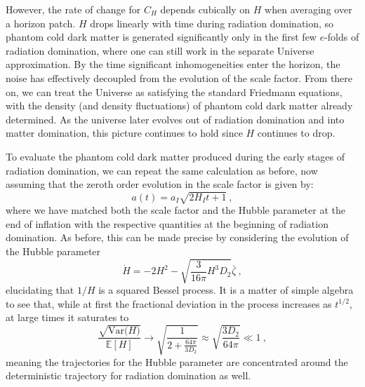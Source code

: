 \documentclass[amsmath,amssymb,11pt]{article}
\begin{document}
However, the rate of change for $C_H$ depends cubically on $H$ when averaging over a horizon patch. $H$ drops linearly with time during radiation domination, so phantom cold dark matter is generated significantly only in the first few $e$-folds of radiation domination, where one can still work in the separate Universe approximation. By the time significant inhomogeneities enter the horizon, the noise has effectively decoupled from the evolution of the scale factor. From there on, we can treat the Universe as satisfying the standard Friedmann equations, with the density (and density fluctuations) of phantom cold dark matter already determined. As the universe later evolves out of radiation domination and into matter domination, this picture continues to hold since $H$ continues to drop.

To evaluate the phantom cold dark matter produced during the early stages of radiation domination, we can repeat the same calculation as before, now assuming that the zeroth order evolution in the scale factor is given by:
\begin{equation}
    a(t) = a_I \sqrt{2 H_I t + 1} \ ,
\end{equation}
where we have matched both the scale factor and the Hubble parameter at the end of inflation with the respective quantities at the beginning of radiation domination. As before, this can be made precise by considering the evolution of the Hubble parameter
\begin{equation}
    \dot{H} = -2H^2 - \sqrt{\frac{3}{16\pi} H^3 D_2}\bar{\zeta} \ ,
\end{equation}
elucidating that $1/H$ is a squared Bessel process. It is a matter of simple algebra to see that, while at first the fractional deviation in the process increases as $t^{1/2}$, at large times it saturates to
\begin{equation}
    \frac{\sqrt{\textrm{Var($H$)}}}{\mathbb{E}[H]} \to \sqrt{\frac{1}{2+ \frac{64\pi}{3D_2}}} \approx \sqrt{\frac{3 D_2}{64\pi}} \ll 1\ ,
\end{equation}
meaning the trajectories for the Hubble parameter are concentrated around the deterministic trajectory for radiation domination as well.
\end{document}
